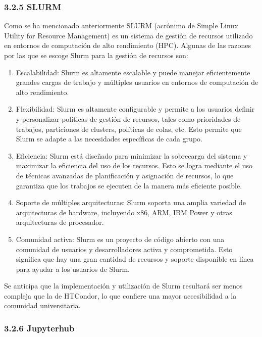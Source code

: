 \begin{spacing}{1.5}
    \subsubsection{3.2.5 SLURM}

    Como se ha mencionado anteriormente SLURM (acrónimo de Simple Linux Utility for Resource Management) es un sistema de gestión de recursos utilizado en entornos de computación de alto rendimiento (HPC). Algunas de las razones por las que se escoge Slurm para la gestión de recursos son:

    \begin{enumerate}
      \item Escalabilidad: Slurm es altamente escalable y puede manejar eficientemente grandes cargas de trabajo y múltiples usuarios en entornos de computación de alto rendimiento.
      \item Flexibilidad: Slurm es altamente configurable y permite a los usuarios definir y personalizar políticas de gestión de recursos, tales como prioridades de trabajos, particiones de clusters, políticas de colas, etc. Esto permite que Slurm se adapte a las necesidades específicas de cada grupo.
      \item Eficiencia: Slurm está diseñado para minimizar la sobrecarga del sistema y maximizar la eficiencia del uso de los recursos. Esto se logra mediante el uso de técnicas avanzadas de planificación y asignación de recursos, lo que garantiza que los trabajos se ejecuten de la manera más eficiente posible.
      \item Soporte de múltiples arquitecturas: Slurm soporta una amplia variedad de arquitecturas de hardware, incluyendo x86, ARM, IBM Power y otras arquitecturas de procesador.
      \item Comunidad activa: Slurm es un proyecto de código abierto con una comunidad de usuarios y desarrolladores activa y comprometida. Esto significa que hay una gran cantidad de recursos y soporte disponible en línea para ayudar a los usuarios de Slurm.
    \end{enumerate}

    Se anticipa que la implementación y utilización de Slurm resultará ser menos compleja que la de HTCondor, lo que confiere una mayor accesibilidad a la comunidad universitaria. \cite{RHEL-SLURM-1}

    \subsubsection{3.2.6 Jupyterhub}


\end{spacing}
